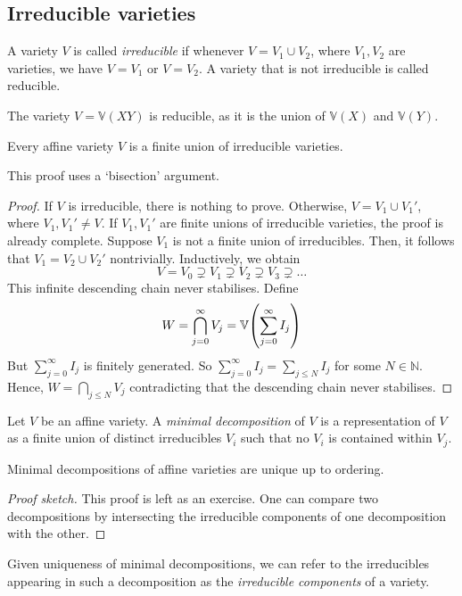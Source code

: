 \subsection{Irreducible varieties}
\begin{definition}
    A variety \( V \) is called \emph{irreducible} if whenever \( V = V_1 \cup V_2 \), where \( V_1, V_2 \) are varieties, we have \( V = V_1 \) or \( V = V_2 \).
    A variety that is not irreducible is called reducible.
\end{definition}
\begin{example}
    The variety \( V = \mathbb V(XY) \) is reducible, as it is the union of \( \mathbb V(X) \) and \( \mathbb V(Y) \).
\end{example}
\begin{proposition}
    Every affine variety \( V \) is a finite union of irreducible varieties.
\end{proposition}
This proof uses a `bisection' argument.
\begin{proof}
    If \( V \) is irreducible, there is nothing to prove.
    Otherwise, \( V = V_1 \cup V_1' \), where \( V_1, V_1' \neq V \).
    If \( V_1, V_1' \) are finite unions of irreducible varieties, the proof is already complete.
    Suppose \( V_1 \) is not a finite union of irreducibles.
    Then, it follows that \( V_1 = V_2 \cup V_2' \) nontrivially.
    Inductively, we obtain
    \[ V = V_0 \supsetneq V_1 \supsetneq V_2 \supsetneq V_3 \supsetneq \dots \]
    This infinite descending chain never stabilises.
    Define
    \[ W = \bigcap_{j=0}^\infty V_j = \mathbb V\qty(\sum_{j=0}^\infty I_j) \]
    But \( \sum_{j=0}^\infty I_j \) is finitely generated.
    So \( \sum_{j=0}^\infty I_j = \sum_{j \leq N} I_j \) for some \( N \in \mathbb N \).
    Hence, \( W = \bigcap_{j \leq N} V_j \) contradicting that the descending chain never stabilises.
\end{proof}
\begin{definition}
    Let \( V \) be an affine variety.
    A \emph{minimal decomposition} of \( V \) is a representation of \( V \) as a finite union of distinct irreducibles \( V_i \) such that no \( V_i \) is contained within \( V_j \).
\end{definition}
\begin{proposition}
    Minimal decompositions of affine varieties are unique up to ordering.
\end{proposition}
\begin{proof}[Proof sketch]
    This proof is left as an exercise.
    One can compare two decompositions by intersecting the irreducible components of one decomposition with the other.
\end{proof}
Given uniqueness of minimal decompositions, we can refer to the irreducibles appearing in such a decomposition as the \emph{irreducible components} of a variety.

